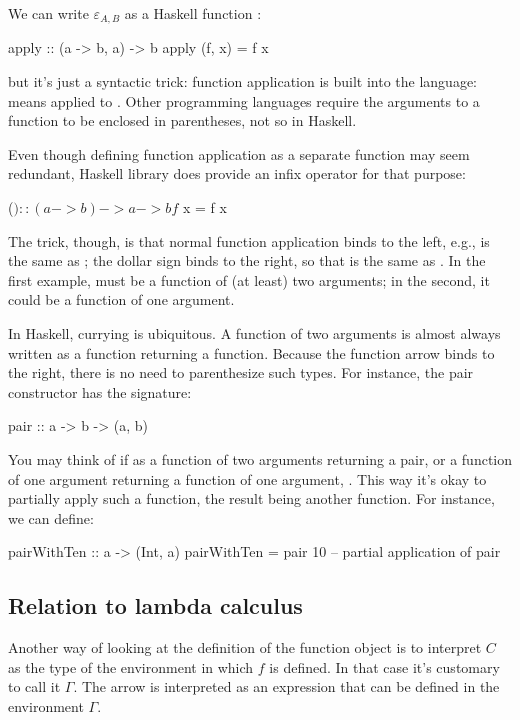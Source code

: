 \documentclass[DaoFP]{subfiles}
\begin{document}
We can write $\varepsilon_{A, B}$ as a Haskell function :
\begin{haskell}
apply :: (a -> b, a) -> b
apply (f, x) = f x
\end{haskell}
but it's just a syntactic trick: function application is built into the language:  means  applied to . Other programming languages require the arguments to a function to be enclosed in parentheses, not so in Haskell. 

Even though defining function application as a separate function may seem redundant, Haskell library does provide an infix operator \hask{$} for that purpose:
\begin{haskell}
($) :: (a -> b) -> a -> b
f $ x = f x
\end{haskell}
The trick, though, is that normal function application binds to the left, e.g.,  is the same as ; the dollar sign binds to the right, so that  is the same as . In the first example,  must be a function of (at least) two arguments; in the second, it could be a function of one argument.

In Haskell, currying is ubiquitous. A function of two arguments is almost always written as a function returning a function. Because the function arrow \hask{->} binds to the right, there is no need to parenthesize such types. For instance, the pair constructor has the signature:
\begin{haskell}
pair :: a -> b -> (a, b)
\end{haskell}
You may think of if as a function of two arguments returning a pair, or a function of one argument returning a function of one argument, . This way it's okay to partially apply such a function, the result being another function. For instance, we can define:
\begin{haskell}
pairWithTen :: a -> (Int, a)
pairWithTen = pair 10 -- partial application of pair
\end{haskell}



\subsection{Relation to lambda calculus}

Another way of looking at the definition of the function object is to interpret $C$ as the type of the environment in which $f$ is defined. In that case it's customary to call it $\Gamma$. The arrow is interpreted as an expression that can be defined in the environment $\Gamma$. 
\end{document}

